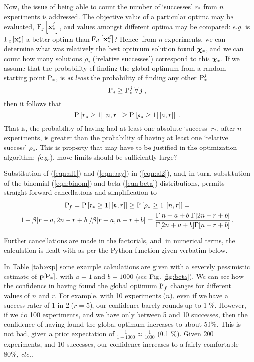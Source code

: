\documentclass[11pt]{article}
\begin{document}
Now, the issue of being able to count the number of `successes' $r_\ast$ from $n$ experiments is addressed. The objective value of a particular optima may be evaluated, $\F_j \left[ \bx^j_\ast \right]$, and values amongst different optima may be compared: \emph{e.g.} is $\F_c \left[ \bx^c_\ast \right]$ a better optima than $\F_d \left[ \bx^d_\ast \right]$? Hence, from $n$ experiments, we can determine what was relatively the best optimum solution found $\bchi_\ast$, and we can count how many solutions $\rho_\ast$ (`relative successes') correspond to this $\bchi_\ast$. If we assume that the probability of finding the global optimum from a random starting point $\P_\ast$, is \emph{at least} the probability of finding any other $\P^j_\ast$
\begin{equation}
\P_\ast \ge \P^j_\ast \: \forall \: j \:,
\end{equation}
then it follows that
\begin{equation}
\P \left[ r_\ast \ge 1 | \left[ n, r \right] \right] \ge \P \left[ \rho_\ast \ge 1 | \left[ n, r \right] \right] \: .
\end{equation}
That is, the probability of having had at least one absolute `success' $r_\ast$, after $n$ experiments, is greater than the probability of having at least one `relative success' $\rho_\ast$. This is property that may have to be justified in the optimization algorithm; \emph(e.g.), move-limits should be sufficiently large?

Substitution of (\ref{eqn:al1}) and (\ref{eqn:bay}) in (\ref{eqn:al2}), and, in turn, substitution of the binomial (\ref{eqn:binom}) and beta (\ref{eqn:beta}) distributions, permits straight-forward cancellations and simplification \cite{snyman1987} to
\begin{multline}
\label{eqn:res}
\P_f = \P \left[ r_\ast \ge 1 | \left[ n, r \right] \right]  \ge \P \left[ \rho_\ast \ge 1 | \left[ n, r \right] \right] = \\  1 - \beta[r+a,2n-r+b]/\beta[r +a,n-r+b] = \frac{\Gamma[n+a+b]\Gamma[2n-r+b]}{\Gamma[2n+a+b]\Gamma[n-r+b]}\:.
\end{multline}

Further cancellations are made in the factorials, and, in numerical terms, the calculation is dealt with as per the Python function given verbatim below. 

In Table \ref{tab:exp} some example calculations are given with a severely pessimistic estimate of $\p[\P_\ast]$, with $a=1$ and $b=1000$ (see Fig. \ref{fig:beta}). We can see how the confidence in having found the global optimum $\P_f$ changes for different values of $n$ and $r$. For example, with 10 experiments ($n$), even if we have a success rater of 1 in 2 ($r=5$), our confidence barely rounds-up to 1 \%.  However, if we do 100 experiments, and we have only between 5 and 10 successes, then the confidence of having found the global optimum increases to about 50\%. This is not bad, given a prior expectation of $\frac{1}{1 + 1000} \approx \frac{1}{1000}$ (0.1 \%). Given 200 experiments, and 10 successes, our confidence increases to a fairly comfortable 80\%, \emph{etc.}.
\end{document}
